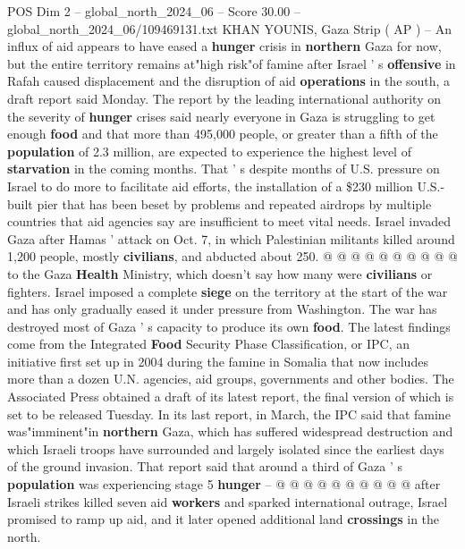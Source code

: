 \begin{textsample}{POS Dim 2 – global\_north\_2024\_06 – Score 30.00 – global\_north\_2024\_06/109469131.txt}  \label{ex:f2_pos_253}
KHAN YOUNIS, Gaza Strip ( AP ) -- An influx of aid appears to have eased a \textbf{hunger} crisis in \textbf{northern} Gaza for now, but the entire territory remains at"high risk"of famine after Israel ' s \textbf{offensive} in Rafah caused displacement and the disruption of aid \textbf{operations} in the south, a draft report said Monday.
The report by the leading international authority on the severity of \textbf{hunger} crises said nearly everyone in Gaza is struggling to get enough \textbf{food} and that more than 495,000 people, or greater than a fifth of the \textbf{population} of 2.3 million, are expected to experience the highest level of \textbf{starvation} in the coming months.
That ' s despite months of U.S. pressure on Israel to do more to facilitate aid efforts, the installation of a \$230 million U.S.-built pier that has been beset by problems and repeated airdrops by multiple countries that aid agencies say are insufficient to meet vital needs.
Israel invaded Gaza after Hamas ' attack on Oct. 7, in which Palestinian militants killed around 1,200 people, mostly \textbf{civilians}, and abducted about 250. @ @ @ @ @ @ @ @ @ @ to the Gaza \textbf{Health} Ministry, which doesn't say how many were \textbf{civilians} or fighters.
Israel imposed a complete \textbf{siege} on the territory at the start of the war and has only gradually eased it under pressure from Washington.
The war has destroyed most of Gaza ' s capacity to produce its own \textbf{food}.
The latest findings come from the Integrated \textbf{Food} Security Phase Classification, or IPC, an initiative first set up in 2004 during the famine in Somalia that now includes more than a dozen U.N. agencies, aid groups, governments and other bodies.
The Associated Press obtained a draft of its latest report, the final version of which is set to be released Tuesday.
In its last report, in March, the IPC said that famine was"imminent"in \textbf{northern} Gaza, which has suffered widespread destruction and which Israeli troops have surrounded and largely isolated since the earliest days of the ground invasion.
That report said that around a third of Gaza ' s \textbf{population} was experiencing stage 5 \textbf{hunger} -- @ @ @ @ @ @ @ @ @ @ after Israeli strikes killed seven aid \textbf{workers} and sparked international outrage, Israel promised to ramp up aid, and it later opened additional land \textbf{crossings} in the north.

\end{textsample}

